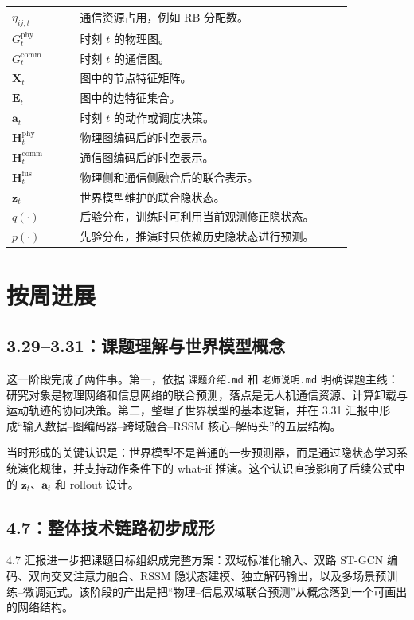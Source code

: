 ﻿\documentclass[UTF8,a4paper,11pt]{ctexart}
\newcommand{\code}[1]{\texttt{#1}}
\begin{document}
\begin{longtable}{L{0.18\linewidth} L{0.72\linewidth}}
$\eta_{ij,t}$ & 通信资源占用，例如 RB 分配数。\\
$G_t^{\mathrm{phy}}$ & 时刻 $t$ 的物理图。\\
$G_t^{\mathrm{comm}}$ & 时刻 $t$ 的通信图。\\
$\mathbf{X}_t$ & 图中的节点特征矩阵。\\
$\mathbf{E}_t$ & 图中的边特征集合。\\
$\mathbf{a}_t$ & 时刻 $t$ 的动作或调度决策。\\
$\mathbf{H}_t^{\mathrm{phy}}$ & 物理图编码后的时空表示。\\
$\mathbf{H}_t^{\mathrm{comm}}$ & 通信图编码后的时空表示。\\
$\mathbf{H}_t^{\mathrm{fus}}$ & 物理侧和通信侧融合后的联合表示。\\
$\mathbf{z}_t$ & 世界模型维护的联合隐状态。\\
$q(\cdot)$ & 后验分布，训练时可利用当前观测修正隐状态。\\
$p(\cdot)$ & 先验分布，推演时只依赖历史隐状态进行预测。\\
\bottomrule
\end{longtable}

\section{按周进展}

\subsection{3.29--3.31：课题理解与世界模型概念}

这一阶段完成了两件事。第一，依据 \code{课题介绍.md} 和 \code{老师说明.md} 明确课题主线：研究对象是物理网络和信息网络的联合预测，落点是无人机通信资源、计算卸载与运动轨迹的协同决策。第二，整理了世界模型的基本逻辑，并在 3.31 汇报中形成“输入数据--图编码器--跨域融合--RSSM 核心--解码头”的五层结构。

当时形成的关键认识是：世界模型不是普通的一步预测器，而是通过隐状态学习系统演化规律，并支持动作条件下的 what-if 推演。这个认识直接影响了后续公式中的 $\mathbf{z}_t$、$\mathbf{a}_t$ 和 rollout 设计。

\subsection{4.7：整体技术链路初步成形}

4.7 汇报进一步把课题目标组织成完整方案：双域标准化输入、双路 ST-GCN 编码、双向交叉注意力融合、RSSM 隐状态建模、独立解码输出，以及多场景预训练--微调范式。该阶段的产出是把“物理--信息双域联合预测”从概念落到一个可画出的网络结构。
\end{document}
